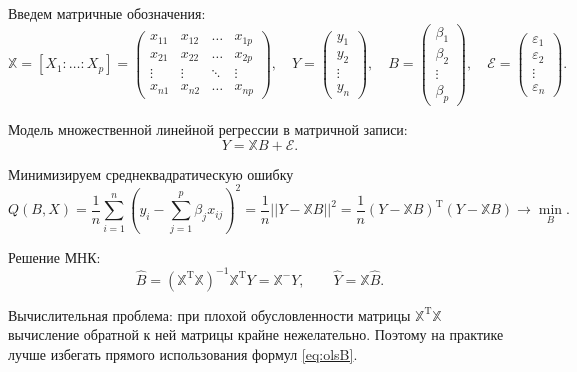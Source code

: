 \documentclass[11pt,colorlinks=true]{article}
\begin{document}
Введем матричные обозначения:
\begin{equation*}
\mathbb{X}=[X_{1}:\ldots:X_{p}]=
\begin{pmatrix}
x_{11} &x_{12} &\ldots &x_{1p}\\
x_{21} &x_{22} &\ldots &x_{2p}\\
\vdots &\vdots &\ddots &\vdots\\
x_{n1} &x_{n2} &\ldots &x_{np}
\end{pmatrix},
\quad
Y
=
\begin{pmatrix}
y_{1}\\
y_{2}\\
\vdots\\
y_{n}
\end{pmatrix},
\quad
B=
\begin{pmatrix}
\beta_{1}\\
\beta_{2}\\
\vdots\\
\beta_{p}
\end{pmatrix},
\quad
\mathcal{E}
=
\begin{pmatrix}
\varepsilon_{1}\\
\varepsilon_{2}\\
\vdots\\
\varepsilon_{n}
\end{pmatrix}.
\end{equation*}



Модель множественной линейной регрессии в матричной записи: 
\begin{equation*}
Y=\mathbb{X}B+\mathcal{E}.
\end{equation*}

Минимизируем среднеквадратическую ошибку 
\begin{equation*}
Q(B,X)
=
\frac{1}{n}
\sum_{i=1}^{n}
\left(
y_{i}-
\sum_{j=1}^{p}\beta_{j}x_{ij}
\right)^{2}
=
\frac{1}{n}
||Y-\mathbb{X}B||^{2}
=
\frac{1}{n}
(Y-\mathbb{X}B)^{\mathrm{T}}(Y-\mathbb{X}B)
\rightarrow
\min_{B}.
\end{equation*}

Решение МНК:
\begin{equation}\label{eq:olsB}
\hat{B}=(\mathbb{X}^{\mathrm{T}}\mathbb{X})^{-1}\mathbb{X}^{\mathrm{T}}Y=\mathbb{X}^{-}Y,
\qquad
\hat{Y}=\mathbb{X}\hat{B}.
\end{equation}


Вычислительная проблема:  при плохой обусловленности матрицы $\mathbb{X}^{\mathrm{T}}\mathbb{X}$ вычисление обратной к ней матрицы крайне нежелательно. Поэтому на практике лучше избегать прямого использования формул \eqref{eq:olsB}.
\end{document}
